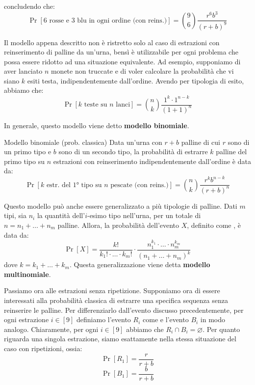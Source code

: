 \documentclass[a4paper, 12pt]{report}
\begin{document}
    concludendo che:
    \[\Pr[\text{6 rosse e 3 blu in ogni ordine (con reins.)}] = \binom{9}{6} \frac{r^6b^3}{(r+b)^9}\]

    Il modello appena descritto non è ristretto solo al caso di estrazioni con reinserimento di palline da un'urna, bensì è utilizzabile per ogni problema che possa essere ridotto ad una situazione equivalente. Ad esempio, supponiamo di aver lanciato $n$ monete non truccate e di voler calcolare la probabilità che vi siano $k$ esiti testa, indipendentemente dall'ordine. Avendo  per tipologia di esito, abbiamo che:
    \[\Pr[\text{$k$ teste su $n$ lanci}] = \binom{n}{k} \frac{1^k \cdot 1^{n-k}}{(1+1)^n}\]
    
    In generale, questo modello viene detto \textbf{modello binomiale}.

    \begin{frameddefn}{Modello binomiale (prob. classica)}
        Data un'urna con $r+b$ palline di cui $r$ sono di un primo tipo e $b$ sono di un secondo tipo, la probabilità di estrarre $k$ palline del primo tipo su $n$ estrazioni con reinserimento indipendentemente dall'ordine è data da:
        \[\Pr[\text{$k$ estr. del 1° tipo su $n$ pescate (con reins.)}] = \binom{n}{k} \frac{r^k b^{n-k}}{(r+b)^n}\]
    \end{frameddefn}

    Questo modello può anche essere generalizzato a più tipologie di palline. Dati $m$ tipi, sia $n_i$ la quantità dell'$i$-esimo tipo nell'urna, per un totale di $n = n_1 + \ldots + n_m$ palline. Allora, la probabilità dell'evento $X$, definito come , è data da:
    \[\Pr[X] = \frac{k!}{k_1! \cdot \ldots \cdot k_m!} \cdot \frac{n_1^{k_1} \cdot \ldots \cdot n_m^{k_m}}{(n_1 + \ldots + n_m)^{k}}\]
    dove $k = k_1 + \ldots + k_m$. Questa generalizzazione viene detta \textbf{modello multinomiale}.

    Passiamo ora alle estrazioni senza ripetizione. Supponiamo ora di essere interessati alla probabilità classica di estrarre una specifica sequenza senza reinserire le palline. Per differenziarlo dall'evento discusso precedentemente, per ogni estrazione $i \in [9]$ definiamo l'evento $R_i$ come  e l'evento $B_i$ in modo analogo. Chiaramente, per ogni $i \in [9]$ abbiamo che $R_i \cap B_i = \varnothing$. Per quanto riguarda una singola estrazione, siamo esattamente nella stessa situazione del caso con ripetizioni, ossia:
    \[\Pr[R_1] = \frac{r}{r+b}\]
    \[\Pr[B_1] = \frac{b}{r+b}\]
\end{document}
